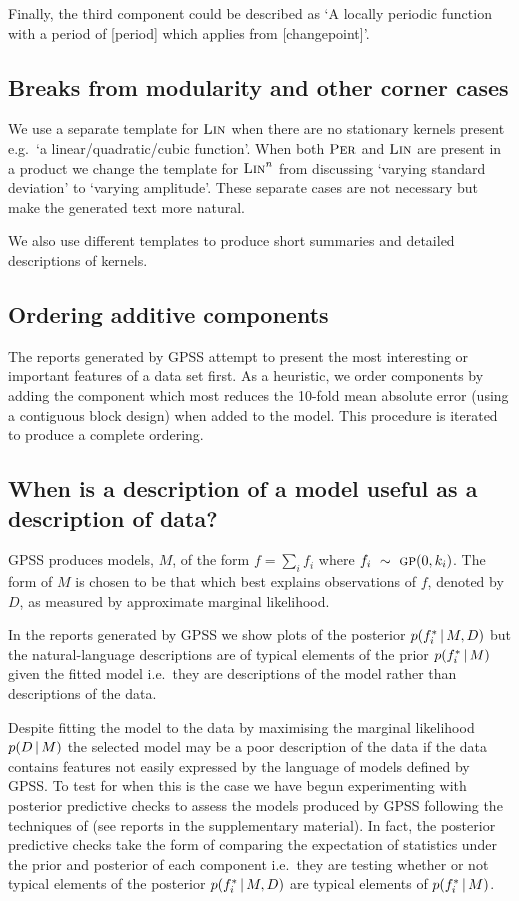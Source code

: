 \documentclass{article}
\def\ie{i.e.\ }
\def\eg{e.g.\ }
\begin{document}
Finally, the third component could be described as `A locally periodic function with a period of [period] which applies from [changepoint]'.

\subsection{Breaks from modularity and other corner cases}

We use a separate template for ${\textsc{Lin}}$ when there are no stationary kernels present \eg `a linear/quadratic/cubic function'.
When both ${\textsc{Per}}$ and ${\textsc{Lin}}$ are present in a product we change the template for ${\textsc{Lin}}^n$ from discussing `varying standard deviation' to `varying amplitude'.
These separate cases are not necessary but make the generated text more natural.

We also use different templates to produce short summaries and detailed descriptions of kernels.

\subsection{Ordering additive components}

The reports generated by GPSS attempt to present the most interesting or important features of a data set first.
As a heuristic, we order components by adding the component which most reduces the 10-fold mean absolute error (using a contiguous block design) when added to the model.
This procedure is iterated to produce a complete ordering.

\subsection{When is a description of a model useful as a description of data?}

GPSS produces models, $M$, of the form $f = \sum_i f_i$ where $f_i \ \sim\  {\textsc{gp}}{}(0, k_i)$.
The form of $M$ is chosen to be that which best explains observations of $f$, denoted by $D$, as measured by approximate marginal likelihood.

In the reports generated by GPSS we show plots of the posterior $p(f_i^*\,|\, M,D)$ but the natural-language descriptions are of typical elements of the prior $p(f_i^*\,|\, M)$ given the fitted model \ie they are descriptions of the model rather than descriptions of the data.

Despite fitting the model to the data by maximising the marginal likelihood $p(D\,|\, M)$ the selected model may be a poor description of the data if the data contains features not easily expressed by the language of models defined by GPSS.
To test for when this is the case we have begun experimenting with posterior predictive checks to assess the models produced by GPSS following the techniques of \cite{Gelman1996} (see reports in the supplementary material).
In fact, the posterior predictive checks take the form of comparing the expectation of statistics under the prior and posterior of each component \ie they are testing whether or not typical elements of the posterior $p(f_i^*\,|\, M,D)$ are typical elements of $p(f_i^*\,|\, M)$.
\end{document}
